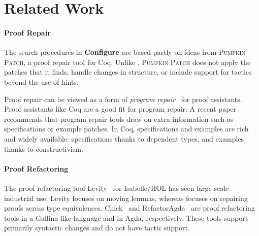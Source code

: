 \section{Related Work}
\label{sec:related}


\paragraph{Proof Repair}

The search procedures in \textbf{Configure} are based partly on ideas from \textsc{Pumpkin Patch}, a proof repair tool for Coq.
Unlike \toolname, \textsc{Pumpkin Patch} does not apply the patches that it finds,
handle changes in structure, or include support for tactics beyond the use of hints.

Proof repair can be viewed as a form of \textit{program repair}~\cite{Monperrus:2018:ASR:3177787.3105906, Gazzola:2018:ASR:3180155.3182526}
for proof assistants.
Proof assistants like Coq are a good fit for program repair: A recent paper~\cite{Qi:2015:APP:2771783.2771791} 
recommends that program repair tools draw on extra information
such as specifications or example patches. In Coq, specifications and examples 
are rich and widely available: specifications thanks to dependent types,
and examples thanks to constructivism.

\paragraph{Proof Refactoring}

The proof refactoring tool Levity~\cite{Bourke12} for Isabelle/HOL has seen large-scale industrial use.
Levity focuses on moving lemmas,
whereas \toolname focuses on repairing proofs across type equivalences.
Chick~\cite{robert2018} and RefactorAgda~\cite{wibergh2019} are proof refactoring tools
in a Gallina-like language and in Agda, respectively.
These tools support primarily syntactic changes and do not have tactic support.

